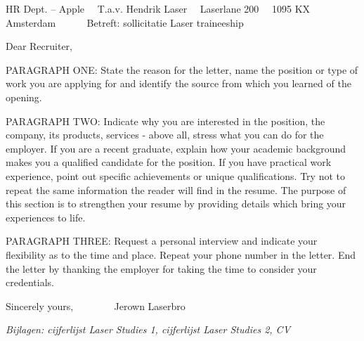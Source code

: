 \documentclass[dutch]{scrlttr2}
\renewcommand{\\}{\ {\large\textperiodcentered}\ }
\begin{document}


\begin{letter}{ %
HR Dept. -- Apple\\
T.a.v. Hendrik Laser\\
Laserlane 200\\
1095 KX Amsterdam\\
~\\
Betreft: sollicitatie Laser traineeship
}


\opening{ }

 \addvspace{3cm} %

Dear Recruiter,\\ %

PARAGRAPH ONE: State the reason for the letter, name the position or type of work you
are applying for and identify the source from which you learned of the opening.\\

PARAGRAPH TWO: Indicate why you are interested in the position, the company, its products,
services - above all, stress what you can do for the employer. If you are a recent graduate,
explain how your academic background makes you a qualified candidate for the position. If
you have practical work experience, point out specific achievements or unique qualifications.
Try not to repeat the same information the reader will find in the resume. The purpose of this
section is to strengthen your resume by providing details which bring your experiences to life.\\

PARAGRAPH THREE: Request a personal interview and indicate your flexibility as to the
time and place. Repeat your phone number in the letter. End the letter by thanking the employer
for taking the time to consider your credentials.\\

Sincerely yours,\\
~\\\\
Jerown Laserbro\\

\emph{Bijlagen: cijferlijst Laser Studies 1, cijferlijst Laser Studies 2, CV}


\end{letter}
\end{document}
